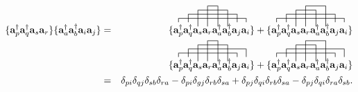 \documentclass[a4paper,norsk,11pt,twoside]{report}
\begin{document}
\begin{align}
\{
\textbf{a}^{\dag}_p \textbf{a}^{\dag}_q
\textbf{a}_s \textbf{a}_r \}
\{
\textbf{a}^{\dag}_a \textbf{a}^{\dag}_b
\textbf{a}_i \textbf{a}_j \} & = &
\{
\contraction[5ex]{\textbf{a}^{\dag}_p \textbf{a}^{\dag}_q 
\textbf{a}_s}{\textbf{a}_r}{}{\textbf{a}^{\dag}_a}
\contraction[4ex]{\textbf{a}^{\dag}_p \textbf{a}^{\dag}_q}{\textbf{a}_s}{\textbf{a}_r
\textbf{a}^{\dag}_a}{\textbf{a}^{\dag}_b}
\contraction[2ex]{\textbf{a}^{\dag}_p}{\textbf{a}^{\dag}_q}{\textbf{a}_s \textbf{a}_r
\textbf{a}^{\dag}_a \textbf{a}^{\dag}_b}{\textbf{a}_j}
\contraction{}{\textbf{a}^{\dag}_p}{\textbf{a}^{\dag}_q 
\textbf{a}_s \textbf{a}_r \textbf{a}^{\dag}_a \textbf{a}^{\dag}_b \textbf{a}_j}{\textbf{a}_i}
\textbf{a}^{\dag}_p \textbf{a}^{\dag}_q 
\textbf{a}_s \textbf{a}_r
\textbf{a}^{\dag}_a \textbf{a}^{\dag}_b
\textbf{a}_j \textbf{a}_i
\}
+
\{
\contraction[4ex]{\textbf{a}^{\dag}_p \textbf{a}^{\dag}_q}{\textbf{a}_s}{\textbf{a}_r}{\textbf{a}^{\dag}_a}
\contraction[5ex]{\textbf{a}^{\dag}_p \textbf{a}^{\dag}_q 
\textbf{a}_s}{\textbf{a}_r}{\textbf{a}^{\dag}_a}{\textbf{a}^{\dag}_b}
\contraction[2ex]{\textbf{a}^{\dag}_p}{\textbf{a}^{\dag}_q}{\textbf{a}_s \textbf{a}_r
\textbf{a}^{\dag}_a \textbf{a}^{\dag}_b}{\textbf{a}_j}
\contraction{}{\textbf{a}^{\dag}_p}{\textbf{a}^{\dag}_q 
\textbf{a}_s \textbf{a}_r \textbf{a}^{\dag}_a \textbf{a}^{\dag}_b \textbf{a}_j}{\textbf{a}_i}
\textbf{a}^{\dag}_p \textbf{a}^{\dag}_q 
\textbf{a}_s \textbf{a}_r
\textbf{a}^{\dag}_a \textbf{a}^{\dag}_b
\textbf{a}_j \textbf{a}_i
\} \nonumber \\ & &
\{
\contraction[5ex]{\textbf{a}^{\dag}_p \textbf{a}^{\dag}_q 
\textbf{a}_s}{\textbf{a}_r}{}{\textbf{a}^{\dag}_a}
\contraction[4ex]{\textbf{a}^{\dag}_p \textbf{a}^{\dag}_q}{\textbf{a}_s}{\textbf{a}_r
\textbf{a}^{\dag}_a}{\textbf{a}^{\dag}_b}
\contraction[2ex]{\textbf{a}^{\dag}_p}{\textbf{a}^{\dag}_q}{\textbf{a}_s \textbf{a}_r
\textbf{a}^{\dag}_a \textbf{a}^{\dag}_b\textbf{a}_j}{\textbf{a}_i}
\contraction{}{\textbf{a}^{\dag}_p}{\textbf{a}^{\dag}_q 
\textbf{a}_s \textbf{a}_r \textbf{a}^{\dag}_a \textbf{a}^{\dag}_b}{\textbf{a}_j}
\textbf{a}^{\dag}_p \textbf{a}^{\dag}_q 
\textbf{a}_s \textbf{a}_r
\textbf{a}^{\dag}_a \textbf{a}^{\dag}_b
\textbf{a}_j \textbf{a}_i
\}
+
\{
\contraction[4ex]{\textbf{a}^{\dag}_p \textbf{a}^{\dag}_q}{\textbf{a}_s}{\textbf{a}_r}{\textbf{a}^{\dag}_a}
\contraction[5ex]{\textbf{a}^{\dag}_p \textbf{a}^{\dag}_q 
\textbf{a}_s}{\textbf{a}_r}{\textbf{a}^{\dag}_a}{\textbf{a}^{\dag}_b}
\contraction[2ex]{\textbf{a}^{\dag}_p}{\textbf{a}^{\dag}_q}{\textbf{a}_s \textbf{a}_r
\textbf{a}^{\dag}_a \textbf{a}^{\dag}_b\textbf{a}_j}{\textbf{a}_i}
\contraction{}{\textbf{a}^{\dag}_p}{\textbf{a}^{\dag}_q 
\textbf{a}_s \textbf{a}_r \textbf{a}^{\dag}_a \textbf{a}^{\dag}_b}{\textbf{a}_j}
\textbf{a}^{\dag}_p \textbf{a}^{\dag}_q 
\textbf{a}_s \textbf{a}_r
\textbf{a}^{\dag}_a \textbf{a}^{\dag}_b
\textbf{a}_j \textbf{a}_i
\} \nonumber \\
& = & \delta_{pi} \delta_{qj} \delta_{sb} \delta_{ra} 
- \delta_{pi} \delta_{gj} \delta_{rb} \delta_{sa}
+ \delta_{pj} \delta_{qi} \delta_{rb} \delta_{sa}
- \delta_{pj} \delta_{qi} \delta_{ra} \delta_{sb} .
\end{align}
\end{document}
